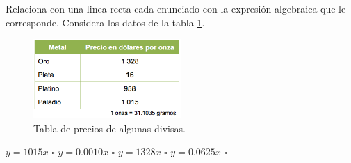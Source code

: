 \question[10] Relaciona con una linea recta cada enunciado con la expresión algebraica que le corresponde. Considera los datos de la tabla \ref{fig:SINMAT1_U3_AC72_IMG1}.
\begin{figure}[H]
    \centering
    \includegraphics[width=0.5\textwidth]{../images/SINMAT1_U3_AC72_IMG1}
    \caption{Tabla de precios de algunas divisas.}
    \label{fig:SINMAT1_U3_AC72_IMG1}
\end{figure}
\begin{multicols}{2}
    \begin{choices}
        \choice $y = 1 015x$ $\square$
        \choice $y = 0.0010x$ $\square$
        \choice $y = 1 328x$ $\square$
        \choice $y = 0.0625x$ $\square$
    \end{choices}
    \columnbreak
\end{multicols}
